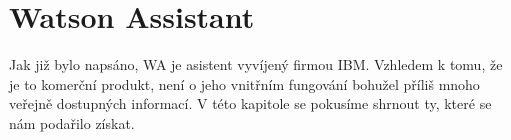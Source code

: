 \chapter{Watson Assistant}

Jak již bylo napsáno, WA je asistent vyvíjený firmou IBM.
Vzhledem k tomu, že je to komerční produkt, není o jeho
vnitřním fungování bohužel příliš mnoho veřejně dostupných
informací. V této kapitole se pokusíme shrnout ty, které
se nám podařilo získat.